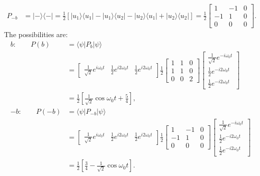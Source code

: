 \documentclass[letterpaper,11pt,twoside]{article}
\newcommand{\ket}[1]{|#1\rangle}
\newcommand{\bra}[1]{\langle#1|}
\newcommand{\braket}[1]{\langle#1\rangle}
\begin{document}
\begin{enumerate}[itemsep=0pt,topsep=0pt,label=\alph*.]
\begin{align*}
    P_{-b}&=\ket{-}\bra{-}=\frac{1}{2}[\ket{u_1}\bra{u_1}-\ket{u_1}\bra{u_2}-\ket{u_2}\bra{u_1}+\ket{u_2}\bra{u_2}]=\frac{1}{2}\begin{bmatrix}
      1&-1&0\\-1&1&0\\0&0&0
    \end{bmatrix}.
  \end{align*}
  The possibilities are:
  \begin{align*}
    b:\qquad P(b)&=\braket{\psi|P_b|\psi}\\&=\begin{bmatrix}
      \frac{1}{\sqrt{2}}e^{i\omega_0t}&\frac{1}{2}e^{i2\omega_0t}&\frac{1}{2}e^{i2\omega_0t}
    \end{bmatrix}\frac{1}{2}\begin{bmatrix}
      1&1&0\\1&1&0\\0&0&2
    \end{bmatrix}\begin{bmatrix}
      \frac{1}{\sqrt{2}}e^{-i\omega_0t}\\\frac{1}{2}e^{-i2\omega_0t}\\\frac{1}{2}e^{-i2\omega_0t}
    \end{bmatrix}\\
    &=\frac{1}{2}\left[\frac{1}{\sqrt{2}}\cos\omega_0t+\frac{5}{4}\right],\\
    -b:\qquad P(-b)&=\braket{\psi|P_{-b}|\psi}\\
    &=\begin{bmatrix}
      \frac{1}{\sqrt{2}}e^{i\omega_0t}&\frac{1}{2}e^{i2\omega_0t}&\frac{1}{2}e^{i2\omega_0t}
    \end{bmatrix}\frac{1}{2}\begin{bmatrix}
      1&-1&0\\-1&1&0\\0&0&0
    \end{bmatrix}\begin{bmatrix}
      \frac{1}{\sqrt{2}}e^{-i\omega_0t}\\\frac{1}{2}e^{-i2\omega_0t}\\\frac{1}{2}e^{-i2\omega_0t}
    \end{bmatrix}\\
    &=\frac{1}{2}\left[\frac{3}{4}-\frac{1}{\sqrt{2}}\cos\omega_0t\right].
  \end{align*}

  
\end{enumerate}
\end{document}
